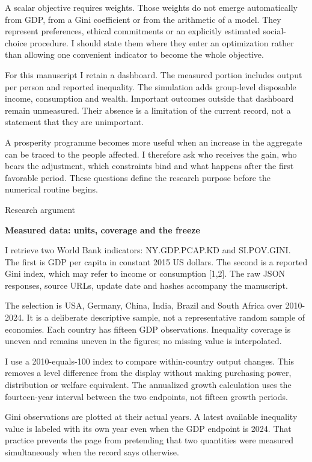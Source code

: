 \documentclass[10pt]{article}
\begin{document}
A scalar objective requires weights. Those weights do not emerge automatically from GDP, from a Gini coefficient or from the arithmetic of a model. They represent preferences, ethical commitments or an explicitly estimated social-choice procedure. I should state them where they enter an optimization rather than allowing one convenient indicator to become the whole objective.\par
For this manuscript I retain a dashboard. The measured portion includes output per person and reported inequality. The simulation adds group-level disposable income, consumption and wealth. Important outcomes outside that dashboard remain unmeasured. Their absence is a limitation of the current record, not a statement that they are unimportant.\par
A prosperity programme becomes more useful when an increase in the aggregate can be traced to the people affected. I therefore ask who receives the gain, who bears the adjustment, which constraints bind and what happens after the first favorable period. These questions define the research purpose before the numerical routine begins.\par
\clearpage
{\small\color{accent}Research argument}\par
{\LARGE\bfseries\color{ink}Measured data: units, coverage and the freeze}\par\vspace{7pt}
I retrieve two World Bank indicators: NY.GDP.PCAP.KD and SI.POV.GINI. The first is GDP per capita in constant 2015 US dollars. The second is a reported Gini index, which may refer to income or consumption [1,2]. The raw JSON responses, source URLs, update date and hashes accompany the manuscript.\par
The selection is USA, Germany, China, India, Brazil and South Africa over 2010-2024. It is a deliberate descriptive sample, not a representative random sample of economies. Each country has fifteen GDP observations. Inequality coverage is uneven and remains uneven in the figures; no missing value is interpolated.\par
I use a 2010-equals-100 index to compare within-country output changes. This removes a level difference from the display without making purchasing power, distribution or welfare equivalent. The annualized growth calculation uses the fourteen-year interval between the two endpoints, not fifteen growth periods.\par
Gini observations are plotted at their actual years. A latest available inequality value is labeled with its own year even when the GDP endpoint is 2024. That practice prevents the page from pretending that two quantities were measured simultaneously when the record says otherwise.\par
\end{document}
